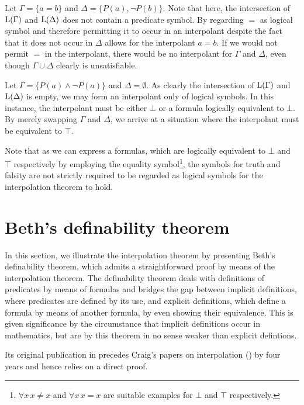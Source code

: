 \begin{exa}
	Let $\Gamma = \{ a=b \} $ and $\Delta = \{P(a), \lnot P(b)\}$.
	Note that here, the intersection of $\operatorname{L}(\Gamma)$ and $\operatorname{L}(\Delta)$ does not contain a predicate symbol.
	By regarding $=$ as logical symbol and therefore permitting it to occur in an interpolant despite the fact that it does not occur in $\Delta$ allows for the interpolant $a=b$.
	If we would not permit $=$ in the interpolant, there would be no interpolant for $\Gamma$ and $\Delta$, even though $\Gamma \cup \Delta$ clearly is unsatisfiable.
\end{exa}

\begin{exa}
	Let $\Gamma = \{ P(a) \land \lnot P(a) \} $ and $\Delta = \emptyset$.
	As clearly the intersection of $\operatorname{L}(\Gamma)$ and $\operatorname{L}(\Delta)$ is empty, we may form an interpolant only of logical symbols.
	In this instance, the interpolant must be either $\bot$ or a formula logically equivalent to $\bot$.
	By merely swapping $\Gamma$ and $\Delta$, we arrive at a situation where the interpolant must be equivalent to $\top$.

	Note that as we can express a formulas, which are logically equivalent to $\bot$ and $\top$ respectively by employing the equality symbol\footnote{$\forall x\,x\neq x$ and $\forall x\,x=x$ are suitable examples for $\bot$ and $\top$ respectively.}, the symbols for truth and falsity are not strictly required to be regarded as logical symbols for the interpolation theorem to hold.
\end{exa}


\section{Beth's definability theorem}
\label{sec:beth}

In this section, we illustrate the interpolation theorem by presenting Beth's definability theorem, which admits a straightforward proof by means of the interpolation theorem. 
The definability theorem deals with definitions of predicates by means of formulas and bridges the gap between implicit definitions, where predicates are defined by its use, and explicit definitions, which define a formula by means of another formula, by even showing their equivalence.
This is given significance by the circumstance that implicit definitions occur in mathematics, but are by this theorem in no sense weaker than explicit defintions.

Its original publication in \cite{beth1953} precedes Craig's papers on interpolation (\cite{Craig57linear,Craig57three}) by four years and hence relies on a direct proof.
 


